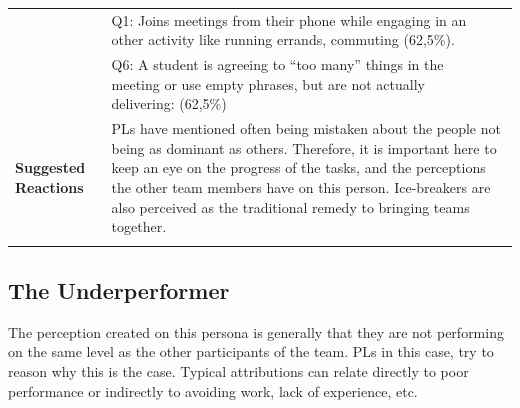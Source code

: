 \begin{longtable}[ht]{ p{}  p{} p{} }
     & Q1: Joins meetings from their phone while engaging in an other activity like running errands, commuting (62,5\%). \\
 	 & Q6: A student is agreeing to “too many” things in the meeting or use empty phrases, but are not actually delivering: (62,5\%)  \\
    \hline
     \textbf{Suggested Reactions} & \multicolumn{2}{p{.80\textwidth}}{PLs have mentioned often being mistaken about the people not being as dominant as others. Therefore, it is important here to keep an eye on the progress of the tasks, and the perceptions the other team members have on this person. Ice-breakers are also perceived as the traditional remedy to bringing teams together.} \\
    \hline
\label{tab:multicol}
\end{longtable}

\subsection{The Underperformer}

The perception created on this persona is generally that they are not performing on the same level as the other participants of the team. PLs in this case, try to reason why this is the case. Typical attributions can relate directly to poor performance or indirectly to avoiding work, lack of experience, etc.


